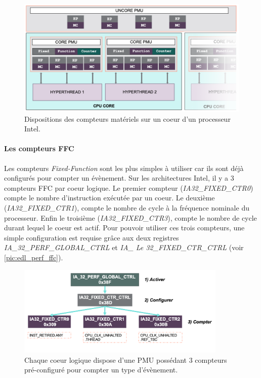         \begin{figure}
        \center
        \includegraphics[width=12cm]{images/edl_perf_pmu.png}
        \caption{\label{pic:edl_perf_pmu} Dispositions des compteurs matériels sur un coeur d'un processeur Intel.}
        \end{figure}
    
        \paragraph{Les compteurs FFC}
        Les compteurs \textit{Fixed-Function} sont les plus simples à utiliser car ils sont déjà configurés pour compter un évènement. Sur les architectures Intel, il y a 3 compteurs FFC par coeur logique. Le premier compteur (\textit{IA32\_FIXED\_CTR0}) compte le nombre d'instruction exécutée par un coeur. Le deuxième (\textit{IA32\_FIXED\_CTR1}), compte le nombre de cycle à la fréquence nominale du processeur. Enfin le troisième (\textit{IA32\_FIXED\_CTR3}), compte le nombre de cycle durant lequel le coeur est actif. Pour pouvoir utiliser ces trois compteurs, une simple configuration est requise grâce aux deux registres \textit{IA\_32\_PERF\_GLOBAL\_CTRL} et \textit{IA\_ Le 32\_FIXED\_CTR\_CTRL} (voir \autoref{pic:edl_perf_ffc}). 
        
        \begin{figure}
        \center
        \includegraphics[width=10cm]{images/edl_perf_ffc.png}
        \caption{\label{pic:edl_perf_ffc} Chaque coeur logique dispose d'une PMU possédant 3 compteurs pré-configuré pour compter un type d'évènement.}
        \end{figure}
        
